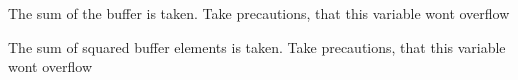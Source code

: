 
\begin{DoxyRefList}
\item[\label{bug__bug000001}%
\hypertarget{bug__bug000001}{}%
global\+Scope$>$ Global \hyperlink{k_buffer_8h_a1389f5c08210e077301c35bc3b43f681}{buffer\+Mean} (\hyperlink{structbuffer__t}{buffer\+\_\+t} $\ast$buffer, buffer\+Datatype $\ast$mean\+Out)]The sum of the buffer is taken. Take precautions, that this variable won\textquotesingle{}t overflow  
\item[\label{bug__bug000002}%
\hypertarget{bug__bug000002}{}%
global\+Scope$>$ Global \hyperlink{k_buffer_8h_a1da694b34c0a52809c923d2d149d1348}{buffer\+Mean\+R\+M\+S} (\hyperlink{structbuffer__t}{buffer\+\_\+t} $\ast$buffer, buffer\+Datatype $\ast$mean\+Out)]The sum of squared buffer elements is taken. Take precautions, that this variable won\textquotesingle{}t overflow 
\end{DoxyRefList}